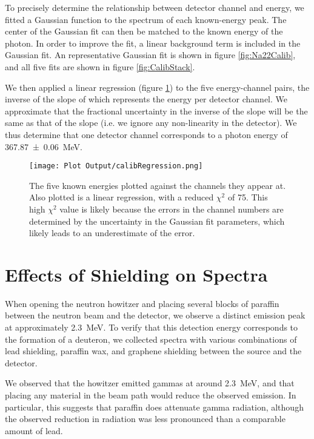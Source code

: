 \documentclass[letter]{article}
\begin{document}
To precisely determine the relationship between detector channel and energy, we fitted a Gaussian function to the spectrum of each known-energy peak. The center of the Gaussian fit can then be matched to the known energy of the photon. In order to improve the fit, a linear background term is included in the Gaussian fit. An representative Gaussian fit is shown in figure \ref{fig:Na22Calib}, and all five fits are shown in figure \ref{fig:CalibStack}.


We then applied a linear regression (figure \ref{fig:CalibFit}) to the five energy-channel pairs, the inverse of the slope of which represents the energy per detector channel. We approximate that the fractional uncertainty in the inverse of the slope will be the same as that of the slope (i.e. we ignore any non-linearity in the detector). We thus determine that one detector channel corresponds to a photon energy of \qty{367.87 \pm 0.06}{\mega\electronvolt}.

\begin{figure}[h] \centering
    \texttt{[image: Plot Output/calibRegression.png]}
    \caption{The five known energies plotted against the channels they appear at. Also plotted is a linear regression, with a reduced $\chi^2$ of 75. This high $\chi^2$ value is likely because the errors in the channel numbers are determined by the uncertainty in the Gaussian fit parameters, which likely leads to an underestimate of the error.}
    \label{fig:CalibFit}
\end{figure}


\section{Effects of Shielding on Spectra}

When opening the neutron howitzer and placing several blocks of paraffin between the neutron beam and the detector, we observe a distinct emission peak at approximately \qty{2.3}{\mega\electronvolt}. To verify that this detection energy corresponds to the formation of a deuteron, we collected spectra with various combinations of lead shielding, paraffin wax, and graphene shielding between the source and the detector. 

We observed that the howitzer emitted gammas at around \qty{2.3}{\mega\electronvolt}, and that placing any material in the beam path would reduce the observed emission. In particular, this suggests that paraffin does attenuate gamma radiation, although the observed reduction in radiation was less pronounced than a comparable amount of lead.
\end{document}
